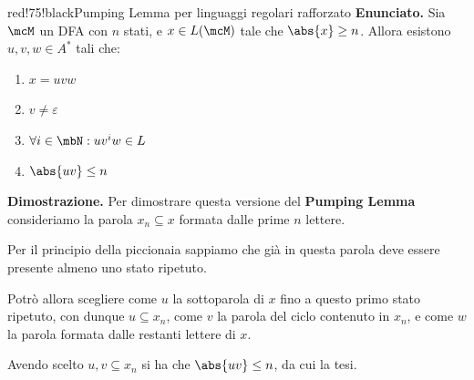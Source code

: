 \newpage

\begin{halfframedbox}{red!75!black}{Pumping Lemma per linguaggi regolari rafforzato}
  \textbf{Enunciato. } Sia \(\mcM\) un DFA con \(n\) stati, e \(x\in L(\mcM)\) tale che \(\abs{x} \geq n\). Allora esistono \(u,v,w \in A^*\) tali che:

  \begin{enumerate}
    \item \(x=uvw\)
    \item \(v \neq \varepsilon\)
    \item \(\forall i \in \mbN: uv^{i}w \in L\)
    \item \(\abs{uv} \leq n\)
    \end{enumerate}

  \begin{center}
    \textcolor{red!75!black}{\hdashrule[0.5ex]{18cm}{1pt}{3mm 3pt 1mm 2pt}}
  \end{center}

  \textbf{Dimostrazione. } Per dimostrare questa versione del \textbf{Pumping Lemma} consideriamo la parola \(x_n \subseteq x\) formata dalle prime \(n\) lettere.

  Per il principio della piccionaia sappiamo che già in questa parola deve essere presente almeno uno stato ripetuto.

  Potrò allora scegliere come \(u\) la sottoparola di \(x\) fino a questo primo stato ripetuto, con dunque \(u \subseteq x_n\), come \(v\) la parola del ciclo contenuto in \(x_n\), e come \(w\) la parola formata dalle restanti lettere di \(x\).

  Avendo scelto \(u,v \subseteq x_n\) si ha che \(\abs{uv} \leq n\), da cui la tesi.
\end{halfframedbox}

